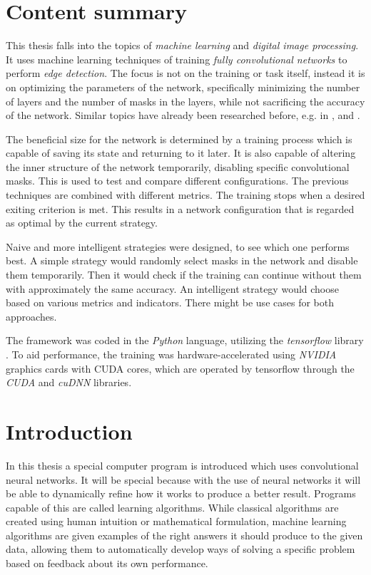 \documentclass[12pt]{report}
\begin{document}
\chapter*{Content summary}

This thesis falls into the topics of \textit{machine learning} and \textit{digital image processing}. It uses machine learning techniques of training \textit{fully convolutional networks} to perform \textit{edge detection}. The focus is not on the training or task itself, instead it is on optimizing the parameters of the network, specifically minimizing the number of layers and the number of masks in the layers, while not sacrificing the accuracy of the network. Similar topics have already been researched before, e.g. in \cite{pruning_web}, \cite{pruning_arxiv} and \cite{understanding}.

The beneficial size for the network is determined by a training process which is capable of saving its state and returning to it later. It is also capable of altering the inner structure of the network temporarily, disabling specific convolutional masks. This is used to test and compare different configurations. The previous techniques are combined with different metrics. The training stops when a desired exiting criterion is met. This results in a network configuration that is regarded as optimal by the current strategy.

Naive and more intelligent strategies were designed, to see which one performs best. A simple strategy would randomly select masks in the network and disable them temporarily. Then it would check if the training can continue without them with approximately the same accuracy. An intelligent strategy would choose based on various metrics and indicators. There might be use cases for both approaches.

The framework was coded in the \textit{Python} language, utilizing the \textit{tensorflow} library \cite{tensorflow2015-whitepaper}. To aid performance, the training was hardware-accelerated using \textit{NVIDIA} graphics cards with CUDA cores, which are operated by tensorflow through the \textit{CUDA} and \textit{cuDNN} libraries.

\chapter*{Introduction}

In this thesis a special computer program is introduced which uses convolutional neural networks. It will be special because with the use of neural networks it will be able to dynamically refine how it works to produce a better result. Programs capable of this are called learning algorithms. While classical algorithms are created using human intuition or mathematical formulation, machine learning algorithms are given examples of the right answers it should produce to the given data, allowing them to automatically develop ways of solving a specific problem based on feedback about its own performance.
\end{document}
